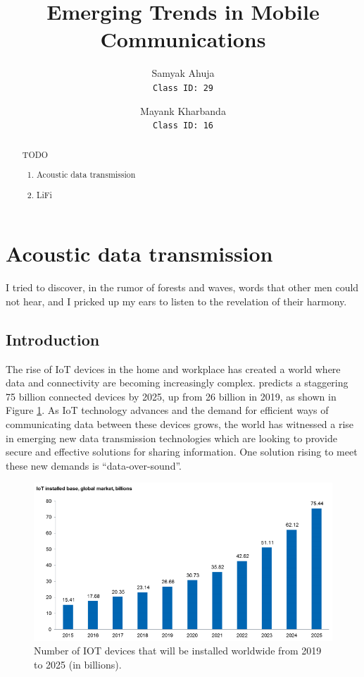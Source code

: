 \documentclass{article}
\title{Emerging Trends in Mobile Communications}
\author{
    Samyak Ahuja \\
    \texttt{Class ID: 29}
    \and
    Mayank Kharbanda \\
    \texttt{Class ID: 16}
}
\begin{document}
\begin{titlepage}
\centering
\vfill
\maketitle
\begin{abstract}
    TODO
    \begin{enumerate}
        \item Acoustic data transmission
        \item LiFi
    \end{enumerate}
\end{abstract}
\vfill
\end{titlepage}

\newpage

\section{Acoustic data transmission}
\epigraph{ I tried to discover, in the rumor of forests and waves, words
that other men could not hear, and I pricked up my ears to listen to the
revelation of their harmony.}{\textcite{november05}}

\subsection{Introduction}
The rise of IoT devices in the home and workplace has created a world where
data and connectivity are becoming increasingly complex. \textcite{ihs16}
predicts a staggering 75 billion connected devices by 2025, up from 26 billion
in 2019, as shown in Figure \ref{fig:ihs_iot}.  As IoT technology advances and the
demand for efficient ways of communicating data between these devices grows,
the world has witnessed a rise in emerging new data transmission technologies
which are looking to provide secure and effective solutions for sharing
information. One solution rising to meet these new demands is “data-over-sound”.

\begin{figure}[!h]
  \includegraphics[width=\linewidth]{res/iot_market_trend.png}
    \caption{Number of IOT devices that will be installed worldwide from 2019
    to 2025 (in billions).}
  \label{fig:ihs_iot}
\end{figure}
\end{document}

